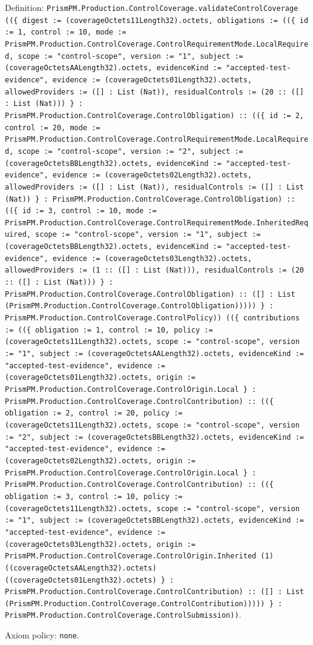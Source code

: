 \documentclass[11pt]{article}
\begin{document}
\noindent Definition: \texttt{PrismPM.Production.ControlCoverage.validateControlCoverage ((\{ digest := (coverageOctets11Length32).octets, obligations := ((\{ id := 1, control := 10, mode := PrismPM.Production.ControlCoverage.ControlRequirementMode.LocalRequired, scope := "control-scope", version := "1", subject := (coverageOctetsAALength32).octets, evidenceKind := "accepted-test-evidence", evidence := (coverageOctets01Length32).octets, allowedProviders := ([] : List (Nat)), residualControls := (20 :: ([] : List (Nat))) \} : PrismPM.Production.ControlCoverage.ControlObligation) :: ((\{ id := 2, control := 20, mode := PrismPM.Production.ControlCoverage.ControlRequirementMode.LocalRequired, scope := "control-scope", version := "2", subject := (coverageOctetsBBLength32).octets, evidenceKind := "accepted-test-evidence", evidence := (coverageOctets02Length32).octets, allowedProviders := ([] : List (Nat)), residualControls := ([] : List (Nat)) \} : PrismPM.Production.ControlCoverage.ControlObligation) :: ((\{ id := 3, control := 10, mode := PrismPM.Production.ControlCoverage.ControlRequirementMode.InheritedRequired, scope := "control-scope", version := "1", subject := (coverageOctetsBBLength32).octets, evidenceKind := "accepted-test-evidence", evidence := (coverageOctets03Length32).octets, allowedProviders := (1 :: ([] : List (Nat))), residualControls := (20 :: ([] : List (Nat))) \} : PrismPM.Production.ControlCoverage.ControlObligation) :: ([] : List (PrismPM.Production.ControlCoverage.ControlObligation))))) \} : PrismPM.Production.ControlCoverage.ControlPolicy)) ((\{ contributions := ((\{ obligation := 1, control := 10, policy := (coverageOctets11Length32).octets, scope := "control-scope", version := "1", subject := (coverageOctetsAALength32).octets, evidenceKind := "accepted-test-evidence", evidence := (coverageOctets01Length32).octets, origin := PrismPM.Production.ControlCoverage.ControlOrigin.Local \} : PrismPM.Production.ControlCoverage.ControlContribution) :: ((\{ obligation := 2, control := 20, policy := (coverageOctets11Length32).octets, scope := "control-scope", version := "2", subject := (coverageOctetsBBLength32).octets, evidenceKind := "accepted-test-evidence", evidence := (coverageOctets02Length32).octets, origin := PrismPM.Production.ControlCoverage.ControlOrigin.Local \} : PrismPM.Production.ControlCoverage.ControlContribution) :: ((\{ obligation := 3, control := 10, policy := (coverageOctets11Length32).octets, scope := "control-scope", version := "1", subject := (coverageOctetsBBLength32).octets, evidenceKind := "accepted-test-evidence", evidence := (coverageOctets03Length32).octets, origin := PrismPM.Production.ControlCoverage.ControlOrigin.Inherited (1) ((coverageOctetsAALength32).octets) ((coverageOctets01Length32).octets) \} : PrismPM.Production.ControlCoverage.ControlContribution) :: ([] : List (PrismPM.Production.ControlCoverage.ControlContribution))))) \} : PrismPM.Production.ControlCoverage.ControlSubmission))}.\par
\noindent Axiom policy: \texttt{none}.\par
\end{document}
